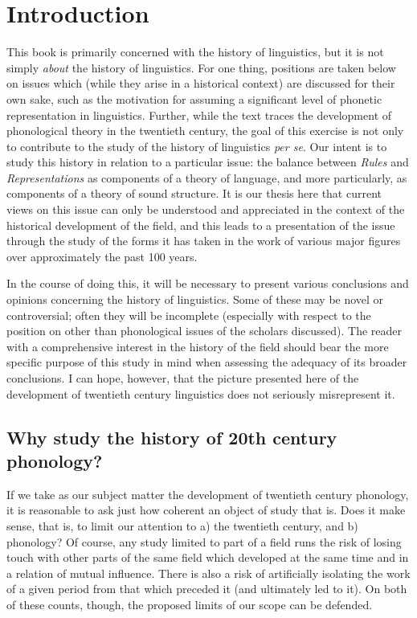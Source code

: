 
\chapter{Introduction}
\label{ch.intro}

\noindent

This book is primarily concerned with the history of linguistics, but
it is not simply \emph{about} the history of linguistics.  For one
thing, positions are taken below on issues which (while they arise in
a historical context) are discussed for their own sake, such as the
motivation for assuming a significant level of phonetic representation
in linguistics.  Further, while the text traces the development of
phonological theory in the twentieth century, the goal of this
exercise is not only to contribute to the study of the history of
linguistics \emph{per se}.  Our intent is to study this history in
relation to a particular issue: the balance between \textit{Rules}
and \textit{Representations} as components of a theory of
language, and more particularly, as components of a theory of sound
structure. It is our thesis here that current views on this issue can
only be understood and appreciated in the context of the historical
development of the field, and this leads to a presentation of the
issue through the study of the forms it has taken in the work of
various major figures over approximately the past 100 years.

In the course of doing this, it will be necessary to present various
conclusions and opinions concerning the history of linguistics. Some
of these may be novel or controversial; often they will be incomplete
(especially with respect to the position on other than phonological
issues of the scholars discussed).  The reader with a comprehensive
interest in the history of the field should bear the more specific
purpose of this study in mind when assessing the adequacy of its
broader conclusions.  I can hope, however, that the picture presented
here of the development of twentieth century linguistics does not
seriously misrepresent it.

\section*{Why study the history of 20th century phonology?}

If we take as our subject matter the development of twentieth century
phonology, it is reasonable to ask just how coherent an object of
study that is. Does it make sense, that is, to limit our attention to
a) the twentieth century, and b) phonology?  Of course, any study
limited to part of a field runs the risk of losing touch with other
parts of the same field which developed at the same time and in a
relation of mutual influence.  There is also a risk of artificially
isolating the work of a given period from that which preceded it (and
ultimately led to it).  On both of these counts, though, the proposed
limits of our scope can be defended.

